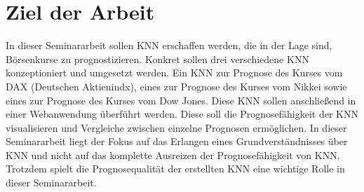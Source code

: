 \section{Ziel der Arbeit}
\label{section:Ziel der Arbeit}
In dieser Seminararbeit sollen KNN erschaffen werden, die in der Lage sind, Börsenkurse zu prognostizieren. Konkret sollen drei verschiedene KNN konzeptioniert und umgesetzt werden. Ein KNN zur Prognose des Kurses vom DAX (Deutschen Aktienindx), eines zur Prognose des Kurses vom Nikkei sowie eines zur Prognose des Kurses vom Dow Jones. Diese KNN sollen anschließend in einer Webanwendung überführt werden. Diese soll die Prognosefähigkeit der KNN visualisieren und Vergleiche zwischen einzelne Prognosen ermöglichen. In dieser Seminararbeit liegt der Fokus auf das Erlangen eines Grundverständnisses über KNN und nicht auf das komplette Ausreizen der Prognosefähigkeit von KNN. Trotzdem spielt die Prognosequalität der erstellten KNN eine wichtige Rolle in dieser Seminararbeit.
